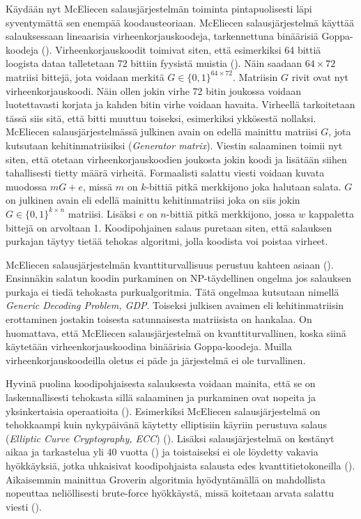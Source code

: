 Käydään nyt McEliecen salausjärjestelmän toiminta pintapuolisesti läpi syventymättä sen enempää koodausteoriaan. McEliecen salausjärjestelmä käyttää salauksessaan lineaarisia virheenkorjauskoodeja, tarkennettuna binäärisiä Goppa-koodeja (\cite{8012331}). Virheenkorjauskoodit toimivat siten, että esimerkiksi 64 bittiä loogista dataa talletetaan 72 bittiin fyysistä muistia (\cite{overbeck2009code}). Näin saadaan $64 \times 72$ matriisi bittejä, jota voidaan merkitä $G \in \{0, 1\}^{64 \times 72}$. Matriisin $G$ rivit ovat nyt virheenkorjauskoodi. Näin ollen jokin virhe 72 bitin joukossa voidaan luotettavasti korjata ja kahden bitin virhe voidaan havaita. Virheellä tarkoitetaan tässä siis sitä, että bitti muuttuu toiseksi, esimerkiksi ykkösestä nollaksi. McEliecen salausjärjestelmässä julkinen avain on edellä mainittu matriisi $G$, jota kutsutaan kehitinmatriisiksi (\emph{Generator matrix}). Viestin salaaminen toimii nyt siten, että otetaan virheenkorjauskoodien joukosta jokin koodi ja lisätään siihen tahallisesti tietty määrä virheitä. Formaalisti salattu viesti voidaan kuvata muodossa $mG+e$, missä $m$ on $k$-bittiä pitkä merkkijono joka halutaan salata. $G$ on julkinen avain eli edellä mainittu kehitinmatriisi joka on siis jokin $G \in \{0, 1\}^{k \times n}$ matriisi. Lisäksi $e$ on $n$-bittiä pitkä merkkijono, jossa $w$ kappaletta bittejä on arvoltaan 1. Koodipohjainen salaus puretaan siten, että salauksen purkajan täytyy tietää tehokas algoritmi, jolla koodista voi poistaa virheet.

McEliecen salausjärjestelmän kvanttiturvallisuus perustuu kahteen asiaan (\cite{8012331}). Ensinnäkin salatun koodin purkaminen on NP-täydellinen ongelma jos salauksen purkaja ei tiedä tehokasta purkualgoritmia. Tätä ongelmaa kutsutaan nimellä \emph{Generic Decoding Problem, GDP}. Toiseksi julkisen avaimen eli kehitinmatriisin erottaminen jostakin toisesta satunnaisesta matriisista on hankalaa. On huomattava, että McEliecen salausjärjestelmä on kvanttiturvallinen, koska siinä käytetään virheenkorjauskoodina binäärisia Goppa-koodeja. Muilla virheenkorjauskoodeilla oletus ei päde ja järjestelmä ei ole turvallinen.

Hyvinä puolina koodipohjaisesta salauksesta voidaan mainita, että se on laskennallisesti tehokasta sillä salaaminen ja purkaminen ovat nopeita ja yksinkertaisia operaatioita (\cite{overbeck2009code}). Esimerkiksi McEliecen salausjärjestelmä on tehokkaampi kuin nykypäivänä käytetty elliptisiin käyriin perustuva salaus (\emph{Elliptic Curve Cryptography, ECC}) (\cite{bernstein2017post}). Lisäksi salausjärjestelmä on kestänyt aikaa ja tarkastelua yli 40 vuotta (\cite{8012331}) ja toistaiseksi ei ole löydetty vakavia hyökkäyksiä, jotka uhkaisivat koodipohjaista salausta edes kvanttitietokoneilla (\cite{overbeck2009code}). Aikaisemmin mainittua Groverin algoritmia hyödyntämällä on mahdollista nopeuttaa neliöllisesti brute-force hyökkäystä, missä koitetaan arvata salattu viesti (\cite{bernstein2017post}).

